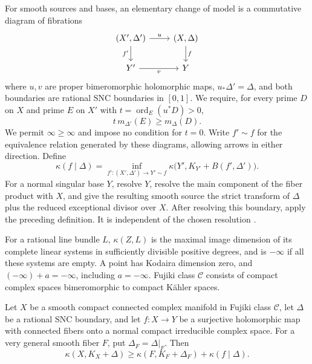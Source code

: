 For smooth sources and bases, an elementary change of model is a
commutative diagram of fibrations
\[
\begin{tikzcd}
 (X',\Delta') \arrow[r,"u"] \arrow[d,"f'"'] &
 (X,\Delta) \arrow[d,"f"]\\
 Y' \arrow[r,"v"'] & Y
\end{tikzcd}
\]
where $u,v$ are proper bimeromorphic holomorphic maps,
$u_*\Delta'=\Delta$, and both boundaries are rational SNC
boundaries in $[0,1]$. We require, for every prime $D$ on $X$
and prime $E$ on $X'$ with $t=\operatorname{ord}_E(u^*D)>0$,
\begin{equation}\label{setup:orbifold-morphism}
                     t\,m_{\Delta'}(E)\geq m_\Delta(D).
\end{equation}
We permit $\infty\geq\infty$ and impose no condition for $t=0$.
Write $f'\sim f$ for the equivalence relation generated by these
diagrams, allowing arrows in either direction. Define
\begin{equation}\label{setup:invariant-base}
 \kappa(f\mid\Delta)=
 \inf_{f':(X',\Delta')\to Y'\sim f}
       \kappa\bigl(Y',K_{Y'}+B(f',\Delta')\bigr).
\end{equation}
For a normal singular base $Y$, resolve $Y$, resolve the main
component of the fiber product with $X$, and give the resulting
smooth source the strict transform of $\Delta$ plus the reduced
exceptional divisor over $X$. After resolving this boundary, apply
the preceding definition. It is independent of the chosen resolution
\cite[Definitions~2.1, 2.3, 3.2, 4.7, and~4.10;
Remark~4.13 and Corollary~4.14]{CampanaOrbifolds}.

For a rational line bundle $L$, $\kappa(Z,L)$ is the maximal image
dimension of its complete linear systems in sufficiently divisible
positive degrees, and is $-\infty$ if all these systems are empty.
A point has Kodaira dimension zero, and
$(-\infty)+a=-\infty$, including $a=-\infty$.
Fujiki class $\mathcal C$ consists of compact complex spaces
bimeromorphic to compact K\"ahler spaces.

\begin{theorem}\label{main:orbifold}
Let $X$ be a smooth compact connected complex manifold in Fujiki
class $\mathcal C$, let $\Delta$ be a rational SNC boundary, and
let $f:X\to Y$ be a surjective holomorphic map with connected
fibers onto a normal compact irreducible complex space.
For a very general smooth fiber $F$, put $\Delta_F=\Delta|_F$.
Then
\begin{equation}\label{main:inequality}
 \kappa(X,K_X+\Delta)
 \geq\kappa(F,K_F+\Delta_F)+\kappa(f\mid\Delta).
\end{equation}
\end{theorem}

